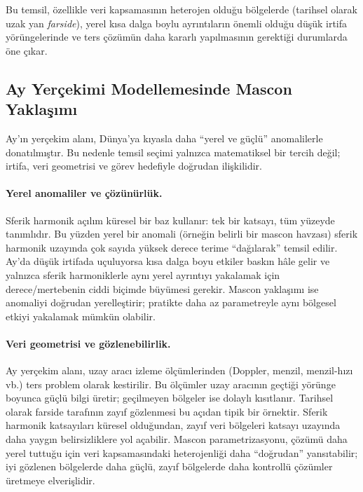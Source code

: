 Bu temsil, özellikle veri kapsamasının heterojen olduğu bölgelerde (tarihsel olarak uzak yan \textit{farside}),
yerel kısa dalga boylu ayrıntıların önemli olduğu düşük irtifa yörüngelerinde ve ters çözümün daha kararlı yapılmasının
gerektiği durumlarda öne çıkar.




\subsection{Ay Yerçekimi Modellemesinde Mascon Yaklaşımı}

Ay’ın yerçekim alanı, Dünya’ya kıyasla daha ``yerel ve güçlü'' anomalilerle donatılmıştır. Bu nedenle temsil seçimi yalnızca matematiksel bir tercih değil; irtifa, veri geometrisi ve görev hedefiyle doğrudan ilişkilidir.

\paragraph{Yerel anomaliler ve çözünürlük.}
Sferik harmonik açılım küresel bir baz kullanır: tek bir katsayı, tüm yüzeyde tanımlıdır.
Bu yüzden yerel bir anomali (örneğin belirli bir mascon havzası) sferik harmonik uzayında çok sayıda
yüksek derece terime ``dağılarak'' temsil edilir. Ay’da düşük irtifada uçuluyorsa kısa dalga boyu etkiler baskın hâle gelir
ve yalnızca sferik harmoniklerle aynı yerel ayrıntıyı yakalamak için derece/mertebenin ciddi biçimde büyümesi gerekir.
Mascon yaklaşımı ise anomaliyi doğrudan yerelleştirir; pratikte daha az parametreyle aynı bölgesel etkiyi
yakalamak mümkün olabilir.

\paragraph{Veri geometrisi ve gözlenebilirlik.}
Ay yerçekim alanı, uzay aracı izleme ölçümlerinden (Doppler, menzil, menzil-hızı vb.) ters problem olarak kestirilir.
Bu ölçümler uzay aracının geçtiği yörünge boyunca güçlü bilgi üretir; geçilmeyen bölgeler ise dolaylı kısıtlanır.
Tarihsel olarak farside tarafının zayıf gözlenmesi bu açıdan tipik bir örnektir.
Sferik harmonik katsayıları küresel olduğundan, zayıf veri bölgeleri katsayı uzayında daha yaygın belirsizliklere yol açabilir.
Mascon parametrizasyonu, çözümü daha yerel tuttuğu için veri kapsamasındaki heterojenliği daha ``doğrudan''
yansıtabilir; iyi gözlenen bölgelerde daha güçlü, zayıf bölgelerde daha kontrollü çözümler üretmeye elverişlidir.

